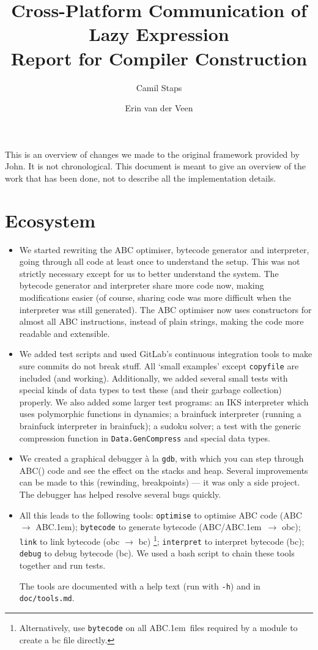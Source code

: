 \documentclass[a4paper]{article}
\title{Cross-Platform Communication of Lazy Expression\\\Large{Report for Compiler Construction}}
\author{Camil Staps \and Erin van der Veen}
\newcommand{\abcstar}{\raisebox{1pt}{$\star$}}
\newcommand{\abcs}{ABC\kern .1em\abcstar}
\begin{document}
\maketitle

This is an overview of changes we made to the original framework provided by John.
It is not chronological.
This document is meant to give an overview of the work that has been done, not to describe all the implementation details.

\section*{Ecosystem}
\begin{itemize}
	\item
		We started rewriting the ABC optimiser, bytecode generator and interpreter,
			going through all code at least once to understand the setup.
		This was not strictly necessary except for us to better understand the system.
		The bytecode generator and interpreter share more code now, making modifications easier
			(of course, sharing code was more difficult when the interpreter was still generated).
		The ABC optimiser now uses constructors for almost all ABC instructions, instead of plain strings,
			making the code more readable and extensible.

	\item
		We added test scripts and used GitLab's continuous integration tools to make sure commits do not break stuff.
		All `small examples' except \texttt{copyfile} are included (and working).
		Additionally, we added several small tests with special kinds of data types to test these (and their garbage collection) properly.
		We also added some larger test programs:
			an IKS interpreter which uses polymorphic functions in dynamics;
			a brainfuck interpreter (running a brainfuck interpreter in brainfuck);
			a sudoku solver;
			a test with the generic compression function in \texttt{Data.GenCompress} and special data types.

	\item
		We created a graphical debugger \`a la \texttt{gdb}, with which you can step through ABC(\abcstar) code and see the effect on the stacks and heap.
		Several improvements can be made to this (rewinding, breakpoints) --- it was only a side project.
		The debugger has helped resolve several bugs quickly.

	\item
		All this leads to the following tools:
		\texttt{optimise} to optimise ABC code (ABC $\to$ \abcs);
		\texttt{bytecode} to generate bytecode (ABC/\abcs\ $\to$ obc);
		\texttt{link} to link bytecode (obc $\to$ bc)%
			\footnote{Alternatively, use \texttt{bytecode} on all \abcs\ files required by a module to create a bc file directly.};
		\texttt{interpret} to interpret bytecode (bc);
		\texttt{debug} to debug bytecode (bc).
		We used a bash script to chain these tools together and run tests.

		The tools are documented with a help text (run with \texttt{-h}) and in \texttt{doc/tools.md}.
\end{itemize}
\end{document}
